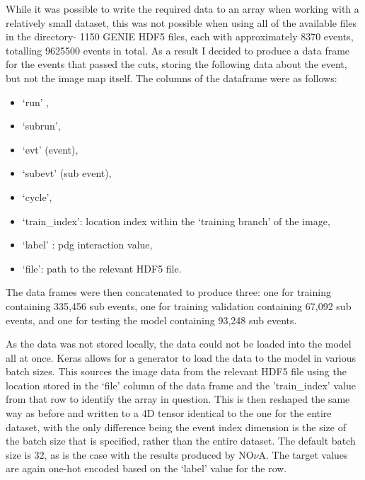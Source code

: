 \noindent While it was possible to write the required data to an array when working with a relatively small dataset, this was not possible when using all of the available files in the directory- 1150 GENIE HDF5 files, each with approximately 8370 events, totalling 9625500 events in total.
As a result I decided to produce a data frame for the events that passed the cuts, storing the following data about the event, but not the image map itself. The columns of the dataframe were as follows:
{\begin{itemize}
 \vspace*{-3mm}
\item ‘run’ ,
 \vspace*{-3mm}
\item ‘subrun’,
 \vspace*{-3mm}
\item ‘evt’ (event),
 \vspace*{-3mm}
\item ‘subevt’ (sub event),
 \vspace*{-3mm}
 \item ‘cycle’,
 \vspace*{-3mm}
\item ‘train\_index’:  location index within the ‘training branch’ of the image,
 \vspace*{-3mm}
\item ‘label’ : pdg interaction value,
 \vspace*{-3mm}
\item ‘file’: path to the relevant HDF5 file. 
  \end{itemize}}

\noindent The data frames were then concatenated to produce three: one for training containing 335,456 sub events, one for training validation containing 67,092 sub events, and one for testing the model containing 93,248 sub events.\medskip

\noindent As the data was not stored locally, the data could not be loaded into the model all at once. Keras allows for a generator to load the data to the model in various batch sizes. This sources the image data from the relevant HDF5 file using the location stored in the ‘file’ column of the data frame and the 'train\_index' value from that row to identify the array in question. This is then reshaped the same way as before and written to a 4D tensor identical to the one for the entire dataset, with the only difference being the event index dimension is the size of the batch size that is specified, rather than the entire dataset. The default batch size is 32, as is the case with the results produced by NO$\nu$A\cite{Aurisano}. The target values are again one-hot encoded based on the ‘label’ value for the row.\medskip

